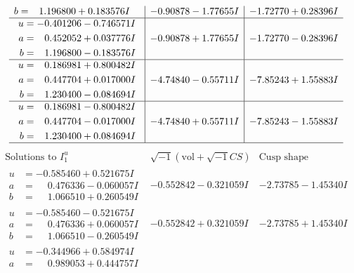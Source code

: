 \documentclass[1p]{elsarticle_modified}
\theoremstyle{definition}
\newcommand{\I}{\sqrt{-1}}
\begin{document}
$$\begin{array}{c|c|c}
\begin{aligned}
b &= \phantom{-}1.196800 + 0.183576 I\end{aligned}
 & -0.90878 - 1.77655 I & -1.72770 + 0.28396 I \\ \hline\begin{aligned}
u &= -0.401206 - 0.746571 I \\
a &= \phantom{-}0.452052 + 0.037776 I \\
b &= \phantom{-}1.196800 - 0.183576 I\end{aligned}
 & -0.90878 + 1.77655 I & -1.72770 - 0.28396 I \\ \hline\begin{aligned}
u &= \phantom{-}0.186981 + 0.800482 I \\
a &= \phantom{-}0.447704 + 0.017000 I \\
b &= \phantom{-}1.230400 - 0.084694 I\end{aligned}
 & -4.74840 - 0.55711 I & -7.85243 + 1.55883 I \\ \hline\begin{aligned}
u &= \phantom{-}0.186981 - 0.800482 I \\
a &= \phantom{-}0.447704 - 0.017000 I \\
b &= \phantom{-}1.230400 + 0.084694 I\end{aligned}
 & -4.74840 + 0.55711 I & -7.85243 - 1.55883 I\\
 \hline 
 \end{array}$$\newpage$$\begin{array}{c|c|c}  
\text{Solutions to }I^u_{1}& \I (\text{vol} + \sqrt{-1}CS) & \text{Cusp shape}\\
 \hline 
\begin{aligned}
u &= -0.585460 + 0.521675 I \\
a &= \phantom{-}0.476336 - 0.060057 I \\
b &= \phantom{-}1.066510 + 0.260549 I\end{aligned}
 & -0.552842 - 0.321059 I & -2.73785 - 1.45340 I \\ \hline\begin{aligned}
u &= -0.585460 - 0.521675 I \\
a &= \phantom{-}0.476336 + 0.060057 I \\
b &= \phantom{-}1.066510 - 0.260549 I\end{aligned}
 & -0.552842 + 0.321059 I & -2.73785 + 1.45340 I \\ \hline\begin{aligned}
u &= -0.344966 + 0.584974 I \\
a &= \phantom{-}0.989053 + 0.444757 I \\

\end{aligned}
\end{array}$$
\end{document}
